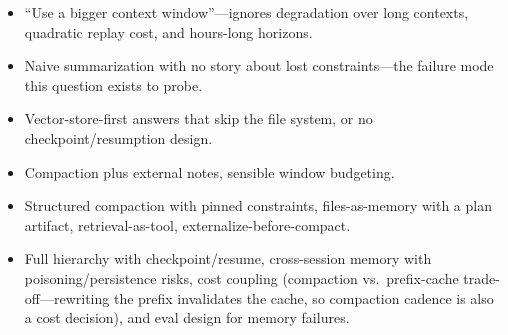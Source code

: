\begin{interviewq}
\redflags
\begin{itemize}
    \item ``Use a bigger context window''---ignores degradation over long contexts, quadratic replay cost, and hours-long horizons.
    \item Naive summarization with no story about lost constraints---the failure mode this question exists to probe.
    \item Vector-store-first answers that skip the file system, or no checkpoint/resumption design.
\end{itemize}


\goodgreat
\begin{itemize}
    \item {} Compaction plus external notes, sensible window budgeting.
    \item {} Structured compaction with pinned constraints, files-as-memory with a plan artifact, retrieval-as-tool, externalize-before-compact.
    \item {} Full hierarchy with checkpoint/resume, cross-session memory with poisoning/persistence risks, cost coupling (compaction vs.\ prefix-cache trade-off---rewriting the prefix invalidates the cache, so compaction cadence is also a cost decision), and eval design for memory failures.
\end{itemize}

\end{interviewq}


